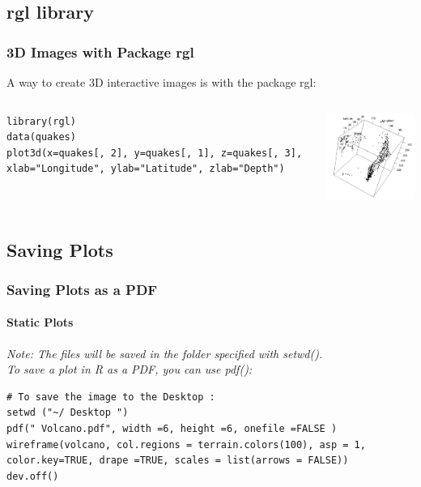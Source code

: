 \subsection{\ttfamily rgl \normalfont library} 
\begin{frame}[fragile]
\frametitle{3D Images with Package \ttfamily rgl \normalfont}

A way to create 3D interactive images is with the package \ttfamily rgl: \normalfont 

    \begin{columns}
\begin{lstlisting}
library(rgl)
data(quakes)
plot3d(x=quakes[, 2], y=quakes[, 1], z=quakes[, 3], xlab="Longitude", ylab="Latitude", zlab="Depth")
\end{lstlisting}

       \begin{center}
\includegraphics[width = 55mm]{images/Fiji_RGL}
\end{center}
\end{columns}
\end{frame}

\subsection{Saving Plots} 
\begin{frame}[fragile]
\frametitle{Saving Plots as a PDF}
\framesubtitle{Static Plots}

\itshape Note: \normalfont The files will be saved in the folder specified with \ttfamily setwd(). \normalfont \\
To save a plot in \ttfamily R \normalfont as a PDF, you can use \ttfamily pdf(): \normalfont

\begin{lstlisting}
# To save the image to the Desktop :
setwd ("~/ Desktop ")
pdf(" Volcano.pdf", width =6, height =6, onefile =FALSE )
wireframe(volcano, col.regions = terrain.colors(100), asp = 1, color.key=TRUE, drape =TRUE, scales = list(arrows = FALSE))
dev.off()
\end{lstlisting}

\end{frame}

